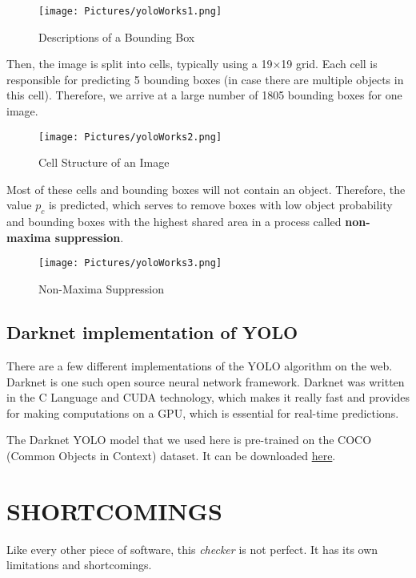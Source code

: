 \documentclass[a4paper]{article}
\begin{document}
\begin{figure}[h]
    \centering
    \texttt{[image: Pictures/yoloWorks1.png]}
    \caption{Descriptions of a Bounding Box}
    \label{fig:descriptionOfBBox}
\end{figure}

Then, the image is split into cells, typically using a 19×19 grid. Each cell is responsible for predicting 5 bounding boxes (in case there are multiple objects in this cell). Therefore, we arrive at a large number of 1805 bounding boxes for one image.

\begin{figure}[h!]
    \centering
    \texttt{[image: Pictures/yoloWorks2.png]}
    \caption{Cell Structure of an Image}
    \label{fig:StructImg}
\end{figure}

Most of these cells and bounding boxes will not contain an object. Therefore, the value $p_c$ is predicted, which serves to remove boxes with low object probability and bounding boxes with the highest shared area in a process called \textbf{non-maxima suppression}.

\begin{figure}[h!]
    \centering
    \texttt{[image: Pictures/yoloWorks3.png]}
    \caption{Non-Maxima Suppression}
    \label{fig:NMS}
\end{figure}
\pagebreak
\subsection{Darknet implementation of YOLO}
There are a few different implementations of the YOLO algorithm on the web. Darknet is one such open source neural network framework. Darknet was written in the C Language and CUDA technology, which makes it really fast and provides for making computations on a GPU, which is essential for real-time predictions.

The Darknet YOLO model that we used here is pre-trained on the COCO (Common Objects in Context) dataset. It can be downloaded \href{https://pjreddie.com/darknet/yolo/}{here}.
\newpage

\section{SHORTCOMINGS}

Like every other piece of software, this \textit{checker} is not perfect. It has its own limitations and shortcomings.
\end{document}
